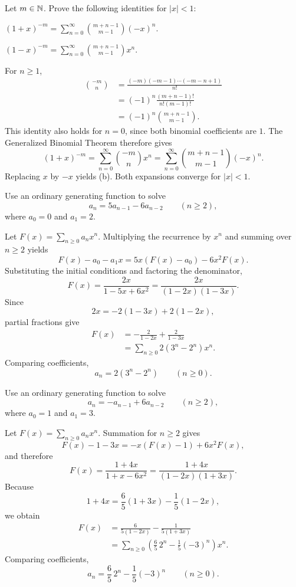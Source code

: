\documentclass[11pt, oneside]{article}
\begin{document}
\begin{problem}
Let $m\in\mathbb{N}$. Prove the following identities for $|x|<1$:
\begin{problemsubparts}
\item $\displaystyle(1+x)^{-m}=\sum_{n=0}^{\infty}
  \binom{m+n-1}{m-1}(-x)^n$.
\item $\displaystyle(1-x)^{-m}=\sum_{n=0}^{\infty}
  \binom{m+n-1}{m-1}x^n$.
\end{problemsubparts}
\end{problem}
\begin{solution}
For $n\ge1$,
\[
\begin{aligned}
\binom{-m}{n}
&=\frac{(-m)(-m-1)\cdots(-m-n+1)}{n!}\\
&=(-1)^n\frac{(m+n-1)!}{n!(m-1)!}\\
&=(-1)^n\binom{m+n-1}{m-1}.
\end{aligned}
\]
This identity also holds for $n=0$, since both binomial coefficients
are $1$. The Generalized Binomial Theorem therefore gives
\[
(1+x)^{-m}=\sum_{n=0}^{\infty}\binom{-m}{n}x^n
=\sum_{n=0}^{\infty}\binom{m+n-1}{m-1}(-x)^n.
\]
Replacing $x$ by $-x$ yields (b). Both expansions converge for $|x|<1$.
\end{solution}

\begin{problem}
Use an ordinary generating function to solve
\[
a_n=5a_{n-1}-6a_{n-2}\qquad(n\ge2),
\]
where $a_0=0$ and $a_1=2$.
\end{problem}
\begin{solution}
Let $F(x)=\displaystyle\sum_{n\ge0}a_nx^n$.
Multiplying the recurrence by $x^n$ and summing over $n\ge2$ yields
\[
F(x)-a_0-a_1x=5x(F(x)-a_0)-6x^2F(x).
\]
Substituting the initial conditions and factoring the denominator,
\[
F(x)=\frac{2x}{1-5x+6x^2}
=\frac{2x}{(1-2x)(1-3x)}.
\]
Since
\[
2x=-2(1-3x)+2(1-2x),
\]
partial fractions give
\[
\begin{aligned}
F(x)&=-\frac{2}{1-2x}+\frac{2}{1-3x}\\
&=\sum_{n\ge0}2(3^n-2^n)x^n.
\end{aligned}
\]
Comparing coefficients,
\[
\boxed{a_n=2(3^n-2^n)\qquad(n\ge0).}
\]
\end{solution}

\begin{problem}
Use an ordinary generating function to solve
\[
a_n=-a_{n-1}+6a_{n-2}\qquad(n\ge2),
\]
where $a_0=1$ and $a_1=3$.
\end{problem}
\begin{solution}
Let $F(x)=\displaystyle\sum_{n\ge0}a_nx^n$. Summation for $n\ge2$
gives
\[
F(x)-1-3x=-x(F(x)-1)+6x^2F(x),
\]
and therefore
\[
F(x)=\frac{1+4x}{1+x-6x^2}
=\frac{1+4x}{(1-2x)(1+3x)}.
\]
Because
\[
1+4x=\frac65(1+3x)-\frac15(1-2x),
\]
we obtain
\[
\begin{aligned}
F(x)&=\frac{6}{5(1-2x)}-\frac{1}{5(1+3x)}\\
&=\sum_{n\ge0}\left(\frac65\,2^n-\frac15(-3)^n\right)x^n.
\end{aligned}
\]
Comparing coefficients,
\[
\boxed{a_n=\frac65\,2^n-\frac15(-3)^n\qquad(n\ge0).}
\]
\end{solution}
\end{document}
